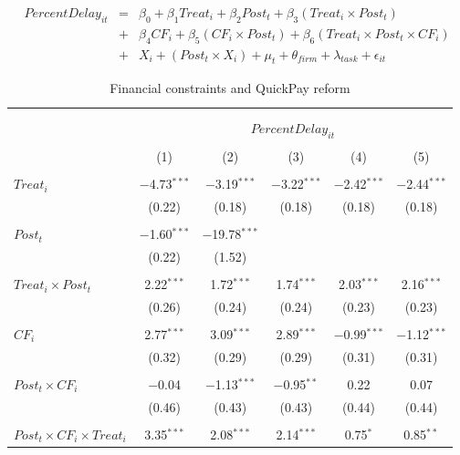 \documentclass[
]{article}
\begin{document}
\[ \begin{aligned}
PercentDelay_{it} &=& \beta_0+\beta_1 Treat_i + \beta_2 Post_t + \beta_3 (Treat_i \times Post_t) \\
&+&\beta_4 CF_i + \beta_5 (CF_i \times Post_t) + \beta_6 (Treat_i \times Post_t \times CF_i) \\ 
&+&X_i + (Post_t \times X_i) + \mu_t + \theta_{firm} + \lambda_{task}+ \epsilon_{it}
\end{aligned}\]

\begin{table}[H] \centering 
  \caption{Financial constraints and QuickPay reform} 
  \label{} 
\small 
\begin{tabular}{@{\extracolsep{-2pt}}lccccc} 
\\[-1.8ex]\hline 
\hline \\[-1.8ex] 
\\[-1.8ex] & \multicolumn{5}{c}{$PercentDelay_{it}$  } \\ 
\\[-1.8ex] & (1) & (2) & (3) & (4) & (5)\\ 
\hline \\[-1.8ex] 
 $Treat_i$ & $-$4.73$^{***}$ & $-$3.19$^{***}$ & $-$3.22$^{***}$ & $-$2.42$^{***}$ & $-$2.44$^{***}$ \\ 
  & (0.22) & (0.18) & (0.18) & (0.18) & (0.18) \\ 
  & & & & & \\ 
 $Post_t$ & $-$1.60$^{***}$ & $-$19.78$^{***}$ &  &  &  \\ 
  & (0.22) & (1.52) &  &  &  \\ 
  & & & & & \\ 
 $Treat_i \times Post_t$ & 2.22$^{***}$ & 1.72$^{***}$ & 1.74$^{***}$ & 2.03$^{***}$ & 2.16$^{***}$ \\ 
  & (0.26) & (0.24) & (0.24) & (0.23) & (0.23) \\ 
  & & & & & \\ 
 $CF_i$ & 2.77$^{***}$ & 3.09$^{***}$ & 2.89$^{***}$ & $-$0.99$^{***}$ & $-$1.12$^{***}$ \\ 
  & (0.32) & (0.29) & (0.29) & (0.31) & (0.31) \\ 
  & & & & & \\ 
 $Post_t \times CF_i$ & $-$0.04 & $-$1.13$^{***}$ & $-$0.95$^{**}$ & 0.22 & 0.07 \\ 
  & (0.46) & (0.43) & (0.43) & (0.44) & (0.44) \\ 
  & & & & & \\ 
 $Post_t \times CF_i \times Treat_i$ & 3.35$^{***}$ & 2.08$^{***}$ & 2.14$^{***}$ & 0.75$^{*}$ & 0.85$^{**}$ \\ 

\end{tabular}
\end{table}
\end{document}
